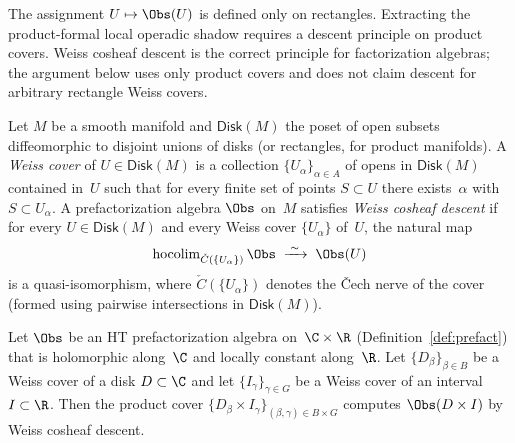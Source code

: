 The assignment $U \mapsto \Obs(U)$ is defined only on rectangles.
Extracting the product-formal local operadic shadow requires a
descent principle on product covers. Weiss cosheaf descent is the
correct principle for factorization algebras; the argument below
uses only product covers and does not claim descent for arbitrary
rectangle Weiss covers.

\begin{definition}
\label{def:weiss-cover}
Let $M$ be a smooth manifold and $\mathsf{Disk}(M)$ the poset of
open subsets diffeomorphic to disjoint unions of disks (or
rectangles, for product manifolds). A \emph{Weiss cover} of
$U \in \mathsf{Disk}(M)$ is a collection $\{U_\alpha\}_{\alpha \in A}$
of opens in $\mathsf{Disk}(M)$ contained in~$U$ such that for every
finite set of points $S \subset U$ there exists~$\alpha$ with
$S \subset U_\alpha$. A prefactorization algebra $\Obs$ on~$M$
satisfies \emph{Weiss cosheaf descent} if for every
$U \in \mathsf{Disk}(M)$ and every Weiss cover
$\{U_\alpha\}$ of~$U$, the natural map
\[
 \operatorname{hocolim}_{\check{C}(\{U_\alpha\})} \Obs
 \;\xrightarrow{\;\sim\;}\;
 \Obs(U)
\]
is a quasi-isomorphism, where
$\check{C}(\{U_\alpha\})$ denotes the \v{C}ech nerve of the cover
(formed using pairwise intersections in $\mathsf{Disk}(M)$).
\end{definition}

\begin{lemma}
\label{lem:product-weiss-descent}
Let $\Obs$ be an HT prefactorization algebra on~$\C \times \R$
(Definition~\textup{\ref{def:prefact}}) that is holomorphic along~$\C$ and
locally constant along~$\R$. Let
$\{D_\beta\}_{\beta\in B}$ be a Weiss cover of a disk $D\subset\C$
and let $\{I_\gamma\}_{\gamma\in G}$ be a Weiss cover of an interval
$I\subset\R$. Then the product cover
$\{D_\beta\times I_\gamma\}_{(\beta,\gamma)\in B\times G}$ computes
$\Obs(D\times I)$ by Weiss cosheaf descent.
\end{lemma}

